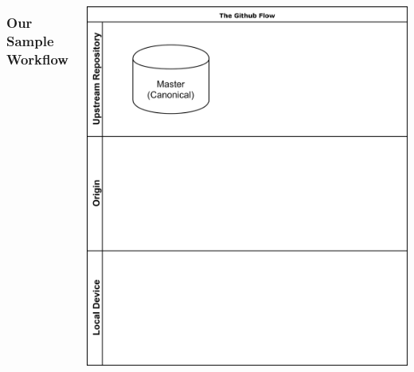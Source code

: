 \documentclass[unknownkeysallowed]{beamer}
\begin{document}
\begin{frame}
    \vspace{1.2cm}
	\begin{columns}
		\column{2.5in}
    \frametitle{Our Sample Workflow}
	\column{2.25in}
	\begin{center}
	\includegraphics[width = .9\linewidth]{assets/gitflow1}
	\end{center}
	\end{columns}
    \vspace{1cm}
\end{frame}
\end{document}
